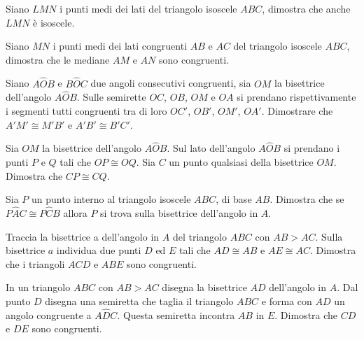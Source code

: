 \begin{multicols}{2}
\begin{esercizio}
\label{ese:2.77}
Siano \(LMN\) i punti medi dei lati del triangolo isoscele \(ABC\), 
dimostra che anche \(LMN\) è isoscele.
\end{esercizio}

\begin{esercizio}
\label{ese:2.78}
Siano \(MN\) i punti medi dei lati congruenti \(AB\) e \(AC\) del triangolo 
isoscele \(ABC\), dimostra che le mediane \(AM\) e \(AN\) sono congruenti.
\end{esercizio}

\begin{esercizio}
\label{ese:2.79}
Siano \(A\widehat{O}B\) e \(B\widehat{O}C\) due angoli consecutivi 
congruenti, sia \(OM\) la bisettrice dell'angolo \(A\widehat{O}B\). Sulle 
semirette \(OC\), \(OB\), \(OM\) e \(OA\) si prendano rispettivamente i 
segmenti tutti congruenti tra di loro \(OC'\), \(OB'\), \(OM'\), \(OA'\). 
Dimostrare che \(A'M'\cong M'B'\) e \(A'B'\cong B'C'\).
\end{esercizio}

\begin{esercizio}
\label{ese:2.80}
Sia \(OM\) la bisettrice dell'angolo \(A\widehat{O}B\). Sul lato 
dell'angolo \(A\widehat{O}B\) si prendano i punti \(P\) e \(Q\) tali che 
\(OP\cong OQ\). Sia \(C\) un punto qualsiasi della bisettrice \(OM\). 
Dimostra che \(CP\cong CQ\).
\end{esercizio}

\begin{esercizio}
\label{ese:2.81}
Sia \(P\) un punto interno al triangolo isoscele \(ABC\), di base \(AB\). 
Dimostra che se \(P\widehat{A}C\cong P\widehat{C}B\) allora \(P\) si 
trova sulla bisettrice dell'angolo in \(A\).
\end{esercizio}

\begin{esercizio}
\label{ese:2.82}
Traccia la bisettrice a dell'angolo in \(A\) del triangolo \(ABC\) con 
\(AB>AC\). Sulla bisettrice \(a\) individua due punti \(D\) ed \(E\) tali che 
\(AD\cong AB\) e \(AE\cong AC\). Dimostra che i triangoli \(ACD\) e \(ABE\) 
sono congruenti.
\end{esercizio}

\begin{esercizio}
\label{ese:2.83}
In un triangolo \(ABC\) con \(AB>AC\) disegna la bisettrice \(AD\) 
dell'angolo in \(A\). Dal punto \(D\) disegna una semiretta che taglia il 
triangolo \(ABC\) e forma con \(AD\) un angolo congruente a 
\(A\widehat{D}C\). Questa semiretta incontra \(AB\) in \(E\). Dimostra che 
\(CD\) e \(DE\) sono congruenti.
\end{esercizio}


\end{multicols}
